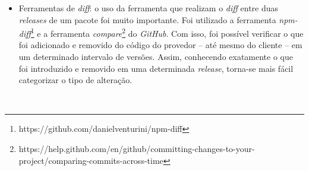 \begin{itemize}
    \item Ferramentas de \textit{diff}: o uso da ferramenta que realizam o  \textit{diff} entre duas \textit{releases} de um pacote foi muito importante. Foi utilizado a ferramenta \textit{npm-diff}\footnote{https://github.com/danielventurini/npm-diff} e a ferramenta \textit{compare}\footnote{https://help.github.com/en/github/committing-changes-to-your-project/comparing-commits-across-time} do \textit{GitHub}. Com isso, foi possível verificar o que foi adicionado e removido do código do provedor -- até mesmo do cliente -- em um determinado intervalo de versões. Assim, conhecendo exatamente o que foi introduzido e removido em uma determinada \textit{release}, torna-se mais fácil categorizar o tipo de alteração.
\end{itemize}

\begin {figure} [h!]
   \centering
   \mbox {
        \quad
}
\end{figure}
